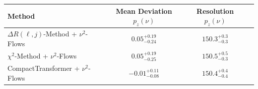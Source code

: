     \begin{tabular}{lccc}
        \toprule
        Method & Mean Deviation $p_{z}(\nu)$ & Resolution $p_{z}(\nu)$ \\
        \midrule
        $\Delta R(\ell,j)$-Method + $\nu^2$-Flows & $0.05^{+0.19}_{-0.24}$ & $150.3^{+0.3}_{-0.3}$ \\
        $\chi^2$-Method + $\nu^2$-Flows & $0.05^{+0.19}_{-0.25}$ & $150.5^{+0.5}_{-0.3}$ \\
        CompactTransformer + $\nu^2$-Flows & $-0.01^{+0.11}_{-0.08}$ & $150.4^{+0.4}_{-0.4}$ \\
        \bottomrule
    \end{tabular}